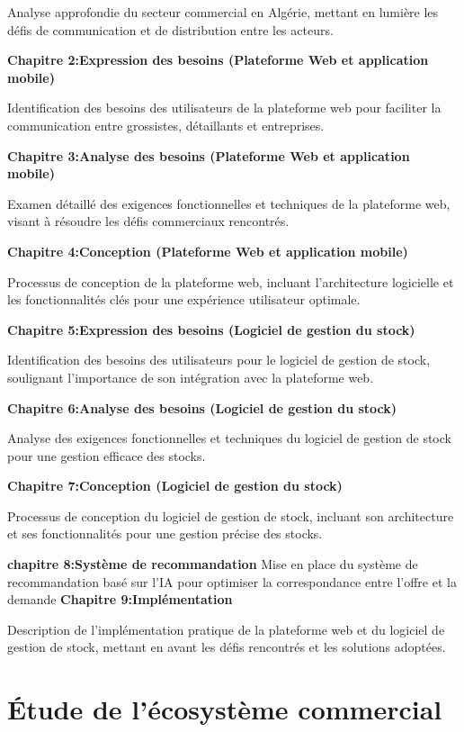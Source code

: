 \documentclass[edit,12pt,a4paper,ChapStyle,oneside,doubleinterligne]{report}
\begin{document}
Analyse approfondie du secteur commercial en Algérie, mettant en lumière les défis de communication et de distribution entre les acteurs.

\textbf{Chapitre 2:Expression des besoins (Plateforme Web et application mobile) }


Identification des besoins des utilisateurs de la plateforme web pour faciliter la communication entre grossistes, détaillants et entreprises.


\textbf{Chapitre 3:Analyse des besoins (Plateforme Web et application mobile) }


Examen détaillé des exigences fonctionnelles et techniques de la plateforme web, visant à résoudre les défis commerciaux rencontrés.


\textbf{Chapitre 4:Conception (Plateforme Web et application mobile) }


Processus de conception de la plateforme web, incluant l'architecture logicielle et les fonctionnalités clés pour une expérience utilisateur optimale.


\textbf{Chapitre 5:Expression des besoins (Logiciel de gestion du stock) }


Identification des besoins des utilisateurs pour le logiciel de gestion de stock, soulignant l'importance de son intégration avec la plateforme web.


\textbf{Chapitre 6:Analyse des besoins (Logiciel de gestion du stock) }


Analyse des exigences fonctionnelles et techniques du logiciel de gestion de stock pour une gestion efficace des stocks.


\textbf{Chapitre 7:Conception (Logiciel de gestion du stock) }


Processus de conception du logiciel de gestion de stock, incluant son architecture et ses fonctionnalités pour une gestion précise des stocks.

\textbf{chapitre 8:Système de recommandation}
Mise en place du système de recommandation basé sur l'IA pour optimiser la correspondance entre l'offre et la demande
\textbf{Chapitre 9:Implémentation }


Description de l'implémentation pratique de la plateforme web et du logiciel de gestion de stock, mettant en avant les défis rencontrés et les solutions adoptées.

\chapter{Étude de l'écosystème commercial}
\newpage
\end{document}
